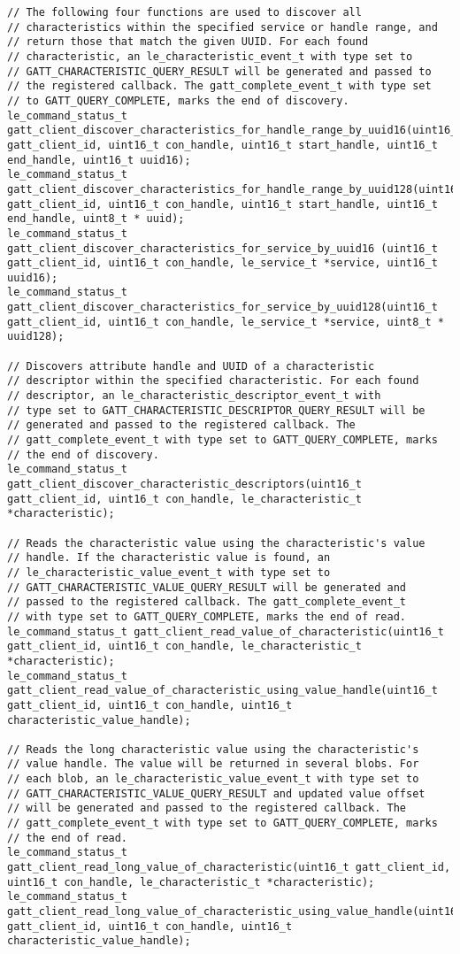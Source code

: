 \begin{lstlisting}
// The following four functions are used to discover all 
// characteristics within the specified service or handle range, and 
// return those that match the given UUID. For each found
// characteristic, an le_characteristic_event_t with type set to   
// GATT_CHARACTERISTIC_QUERY_RESULT will be generated and passed to 
// the registered callback. The gatt_complete_event_t with type set
// to GATT_QUERY_COMPLETE, marks the end of discovery.
le_command_status_t gatt_client_discover_characteristics_for_handle_range_by_uuid16(uint16_t gatt_client_id, uint16_t con_handle, uint16_t start_handle, uint16_t end_handle, uint16_t uuid16);
le_command_status_t gatt_client_discover_characteristics_for_handle_range_by_uuid128(uint16_t gatt_client_id, uint16_t con_handle, uint16_t start_handle, uint16_t end_handle, uint8_t * uuid);
le_command_status_t gatt_client_discover_characteristics_for_service_by_uuid16 (uint16_t gatt_client_id, uint16_t con_handle, le_service_t *service, uint16_t  uuid16);
le_command_status_t gatt_client_discover_characteristics_for_service_by_uuid128(uint16_t gatt_client_id, uint16_t con_handle, le_service_t *service, uint8_t * uuid128);

// Discovers attribute handle and UUID of a characteristic 
// descriptor within the specified characteristic. For each found
// descriptor, an le_characteristic_descriptor_event_t with 
// type set to GATT_CHARACTERISTIC_DESCRIPTOR_QUERY_RESULT will be  
// generated and passed to the registered callback. The  
// gatt_complete_event_t with type set to GATT_QUERY_COMPLETE, marks 
// the end of discovery.
le_command_status_t gatt_client_discover_characteristic_descriptors(uint16_t gatt_client_id, uint16_t con_handle, le_characteristic_t *characteristic);

// Reads the characteristic value using the characteristic's value
// handle. If the characteristic value is found, an 
// le_characteristic_value_event_t with type set to 
// GATT_CHARACTERISTIC_VALUE_QUERY_RESULT will be generated and
// passed to the registered callback. The gatt_complete_event_t 
// with type set to GATT_QUERY_COMPLETE, marks the end of read.
le_command_status_t gatt_client_read_value_of_characteristic(uint16_t gatt_client_id, uint16_t con_handle, le_characteristic_t *characteristic);
le_command_status_t gatt_client_read_value_of_characteristic_using_value_handle(uint16_t gatt_client_id, uint16_t con_handle, uint16_t characteristic_value_handle);

// Reads the long characteristic value using the characteristic's 
// value handle. The value will be returned in several blobs. For 
// each blob, an le_characteristic_value_event_t with type set to 
// GATT_CHARACTERISTIC_VALUE_QUERY_RESULT and updated value offset
// will be generated and passed to the registered callback. The 
// gatt_complete_event_t with type set to GATT_QUERY_COMPLETE, marks
// the end of read.
le_command_status_t gatt_client_read_long_value_of_characteristic(uint16_t gatt_client_id, uint16_t con_handle, le_characteristic_t *characteristic);
le_command_status_t gatt_client_read_long_value_of_characteristic_using_value_handle(uint16_t gatt_client_id, uint16_t con_handle, uint16_t characteristic_value_handle);
    

\end{lstlisting}
